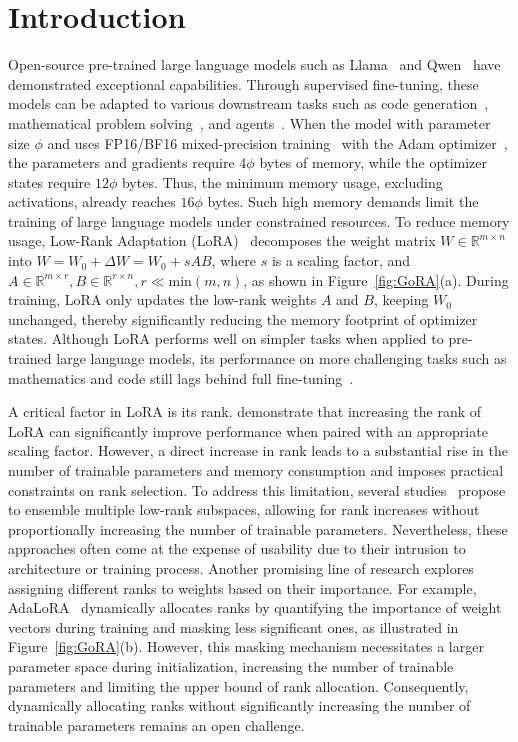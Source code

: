 \section{Introduction}

Open-source pre-trained large language models such as Llama~\citep{touvron2023llama} and Qwen~\citep{bai2023qwen} have demonstrated exceptional capabilities. Through supervised fine-tuning, these models can be adapted to various downstream tasks such as code generation~\citep{roziere2023code}, mathematical problem solving~\citep{yang2024qwen2-math}, and agents~\citep{hong2024cogagent}. When the model with parameter size $\phi$ and uses FP16/BF16 mixed-precision training~\citep{micikevicius2017mixed, kalamkar2019bf16} with the Adam optimizer~\citep{kingma2014adam}, the parameters and gradients require $4\phi$ bytes of memory, while the optimizer states require $12\phi$ bytes. Thus, the minimum memory usage, excluding activations, already reaches $16\phi$ bytes. Such high memory demands limit the training of large language models under constrained resources. To reduce memory usage, Low-Rank Adaptation (LoRA)~\citep{hu2021lora} decomposes the weight matrix \(W \in \mathbb
{R}^{m \times n}\) into \(W = W_0 + \Delta W = W_0 + sAB\), where \(s\) is a scaling factor, and \(A \in \mathbb
{R}^{m\times r}, B \in \mathbb
{R}^{r \times n }, r \ll \text{min}(m,n)\), as shown in Figure~\ref{fig:GoRA}(a). During training, LoRA only updates the low-rank weights \(A\) and \(B\), keeping \(W_0\) unchanged, thereby significantly reducing the memory footprint of optimizer states. Although LoRA performs well on simpler tasks when applied to pre-trained large language models, its performance on more challenging tasks such as mathematics and code still lags behind full fine-tuning~\citep{biderman2024lora_learn_less, ghosh2024closer}.

A critical factor in LoRA is its rank. \citet{kalajdzievski2023rslora} demonstrate that increasing the rank of LoRA can significantly improve performance when paired with an appropriate scaling factor. However, a direct increase in rank leads to a substantial rise in the number of trainable parameters and memory consumption and imposes practical constraints on rank selection.
To address this limitation, several studies~\citep{lialin2023relora, ren2024melora} propose to ensemble multiple low-rank subspaces, allowing for rank increases without proportionally increasing the number of trainable parameters. Nevertheless, these approaches often come at the expense of usability due to their intrusion to architecture or training process. Another promising line of research explores assigning different ranks to weights based on their importance. For example, AdaLoRA~\citep{zhang2023adalora} dynamically allocates ranks by quantifying the importance of weight vectors during training and masking less significant ones, as illustrated in Figure~\ref{fig:GoRA}(b). However, this masking mechanism necessitates a larger parameter space during initialization, increasing the number of trainable parameters and limiting the upper bound of rank allocation.
Consequently, dynamically allocating ranks without significantly increasing the number of trainable parameters remains an open challenge.


